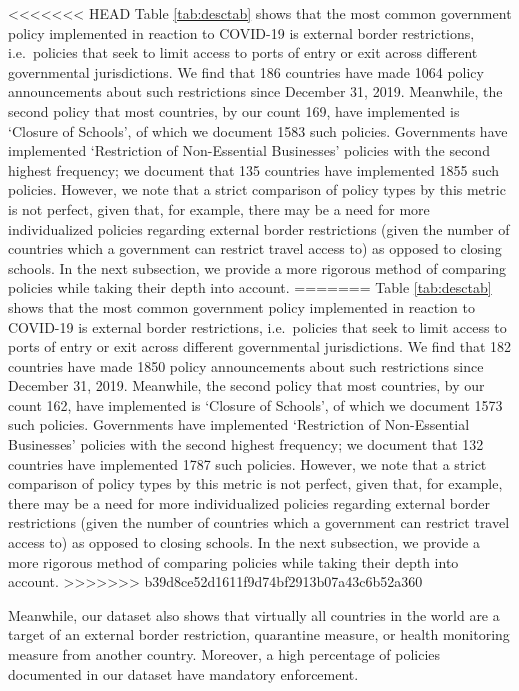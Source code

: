 \documentclass[]{article}
\begin{document}
<<<<<<< HEAD
Table \ref{tab:desctab} shows that the most common government policy implemented in reaction to COVID-19 is external border restrictions, i.e.~policies that seek to limit access to ports of entry or exit across different governmental jurisdictions. We find that 186 countries have made 1064 policy announcements about such restrictions since December 31, 2019. Meanwhile, the second policy that most countries, by our count 169, have implemented is `Closure of Schools', of which we document 1583 such policies. Governments have implemented `Restriction of Non-Essential Businesses' policies with the second highest frequency; we document that 135 countries have implemented 1855 such policies. However, we note that a strict comparison of policy types by this metric is not perfect, given that, for example, there may be a need for more individualized policies regarding external border restrictions (given the number of countries which a government can restrict travel access to) as opposed to closing schools. In the next subsection, we provide a more rigorous method of comparing policies while taking their depth into account.
=======
Table \ref{tab:desctab} shows that the most common government policy implemented in reaction to COVID-19 is external border restrictions, i.e.~policies that seek to limit access to ports of entry or exit across different governmental jurisdictions. We find that 182 countries have made 1850 policy announcements about such restrictions since December 31, 2019. Meanwhile, the second policy that most countries, by our count 162, have implemented is `Closure of Schools', of which we document 1573 such policies. Governments have implemented `Restriction of Non-Essential Businesses' policies with the second highest frequency; we document that 132 countries have implemented 1787 such policies. However, we note that a strict comparison of policy types by this metric is not perfect, given that, for example, there may be a need for more individualized policies regarding external border restrictions (given the number of countries which a government can restrict travel access to) as opposed to closing schools. In the next subsection, we provide a more rigorous method of comparing policies while taking their depth into account.
>>>>>>> b39d8ce52d1611f9d74bf2913b07a43c6b52a360

Meanwhile, our dataset also shows that virtually all countries in the world are a target of an external border restriction, quarantine measure, or health monitoring measure from another country. Moreover, a high percentage of policies documented in our dataset have mandatory enforcement.
\end{document}
